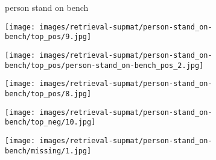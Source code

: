 \documentclass[10pt,twocolumn,letterpaper]{article}
\begin{document}
\begin{figure*}[t]
  
\begin{minipage}[b]{0.005\textwidth}
    	\centering
    	\begin{turn}{90}
    	\small{{\color{blue}person} stand on {\color{red}bench}}
    	\end{turn}	
    \vspace{-3.5ex}
    \end{minipage}
    \hspace{0.01\textwidth}
\begin{minipage}[t]{0.18\textwidth}
    	\centering
       	\texttt{[image: images/retrieval-supmat/person-stand\_on-bench/top\_pos/9.jpg]}\\
       	\vspace{1.5ex}
    \end{minipage}
    \hspace{0.005\textwidth}  
\begin{minipage}[t]{0.18\textwidth}
    	\centering
       	\texttt{[image: images/retrieval-supmat/person-stand\_on-bench/top\_pos/person-stand\_on-bench\_pos\_2.jpg]}\\
       	\vspace{1.5ex}
    \end{minipage}
    \hspace{0.005\textwidth}
\begin{minipage}[t]{0.18\textwidth}
       \centering
       \texttt{[image: images/retrieval-supmat/person-stand\_on-bench/top\_pos/8.jpg]}\\
       \vspace{1.5ex}
    \end{minipage}
    \hspace{0.005\textwidth}
\begin{minipage}[t]{0.18\textwidth}
    	\centering
       	\texttt{[image: images/retrieval-supmat/person-stand\_on-bench/top\_neg/10.jpg]}\\
      	\vspace{1.5ex}
    \end{minipage} 
    \hspace{0.005\textwidth}
\begin{minipage}[t]{0.18\textwidth}
    	\centering
       	\texttt{[image: images/retrieval-supmat/person-stand\_on-bench/missing/1.jpg]}\\
       	\vspace{1.5ex}
    \end{minipage}
     

\end{figure*}
\end{document}
